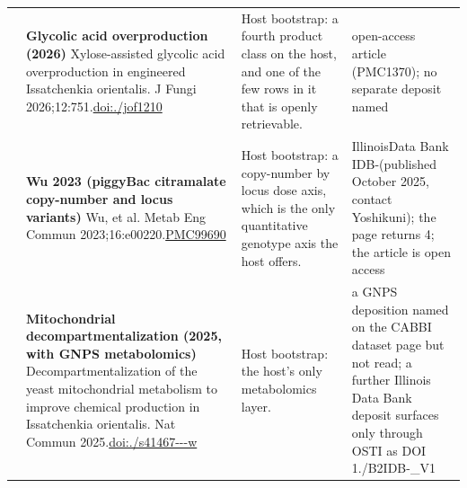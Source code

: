 \begin{landscape}
\begin{longtable}{@{}r@{\hspace{4pt}} L{78mm} L{72mm} L{76mm}@{}}
 & \textbf{Glycolic acid overproduction (2026)} \newline Xylose-assisted glycolic acid overproduction in engineered Issatchenkia orientalis. J Fungi 2026;12:751.\newline \href{https://doi.org/10.3390/jof12100751}{doi:./\allowbreak jof1210} & Host bootstrap: a fourth product class on the host, and one of the few rows in it that is openly retrievable. & open-\allowbreak access \allowbreak article \allowbreak (PMC1370); n\allowbreak o separa\allowbreak te depos\allowbreak it named \\
 & \textbf{Wu 2023 (piggyBac citramalate copy-number and locus variants)} \newline Wu, et al. Metab Eng Commun 2023;16:e00220.\newline \href{https://pmc.ncbi.nlm.nih.gov/articles/PMC9969067}{PMC99690} & Host bootstrap: a copy-number by locus dose axis, which is the only quantitative genotype axis the host offers. & Illinois\allowbreak  Data Ba\allowbreak nk IDB-\allowbreak  (publis\allowbreak hed Octo\allowbreak ber 2025\allowbreak , contac\allowbreak t Yoshik\allowbreak uni); th\allowbreak e page r\allowbreak eturns 4; the \allowbreak article \allowbreak is open \allowbreak access \\
 & \textbf{Mitochondrial decompartmentalization (2025, with GNPS metabolomics)} \newline Decompartmentalization of the yeast mitochondrial metabolism to improve chemical production in Issatchenkia orientalis. Nat Commun 2025.\newline \href{https://doi.org/10.1038/s41467-025-62304-w}{doi:./\allowbreak s41467---\allowbreak w} & Host bootstrap: the host's only metabolomics layer. & a GNPS d\allowbreak epositio\allowbreak n named \allowbreak on the C\allowbreak ABBI dat\allowbreak aset pag\allowbreak e but no\allowbreak t read; \allowbreak a furthe\allowbreak r Illino\allowbreak is Data \allowbreak Bank dep\allowbreak osit sur\allowbreak faces on\allowbreak ly throu\allowbreak gh OSTI \allowbreak as DOI 1./\allowbreak B2IDB-\_\allowbreak V1 \\

\end{longtable}
\end{landscape}
